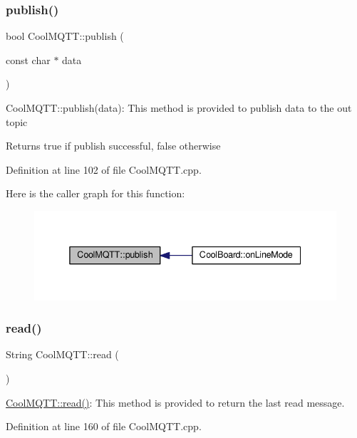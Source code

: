 \subsubsection{\texorpdfstring{publish()}{publish()}}
{\footnotesize\ttfamily bool Cool\+M\+Q\+T\+T\+::publish (\begin{DoxyParamCaption}\item[{const char $\ast$}]{data }\end{DoxyParamCaption})}

Cool\+M\+Q\+T\+T\+::publish(data)\+: This method is provided to publish data to the out topic

\begin{DoxyReturn}{Returns}
true if publish successful, false otherwise 
\end{DoxyReturn}


Definition at line 102 of file Cool\+M\+Q\+T\+T.\+cpp.

Here is the caller graph for this function\+:\nopagebreak
\begin{figure}[H]
\begin{center}
\leavevmode
\includegraphics[width=338pt]{class_cool_m_q_t_t_ace977b3e90ab14b1199fe5c4fb0a13ec_icgraph}
\end{center}
\end{figure}
\mbox{\label{class_cool_m_q_t_t_ae3c18f6ae9723746d32765f1c8f176ca}} 
\subsubsection{\texorpdfstring{read()}{read()}}
{\footnotesize\ttfamily String Cool\+M\+Q\+T\+T\+::read (\begin{DoxyParamCaption}{ }\end{DoxyParamCaption})}

\hyperlink{class_cool_m_q_t_t_ae3c18f6ae9723746d32765f1c8f176ca}{Cool\+M\+Q\+T\+T\+::read()}\+: This method is provided to return the last read message. 

Definition at line 160 of file Cool\+M\+Q\+T\+T.\+cpp.

